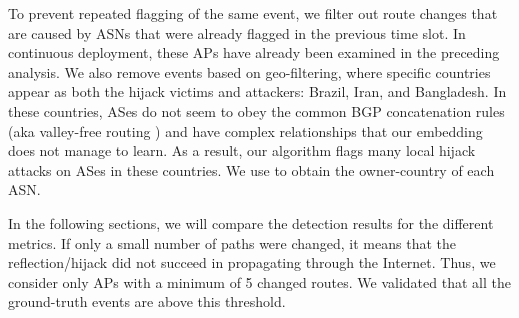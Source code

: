 \documentclass[10pt,journal]{IEEEtran}
\begin{document}
To prevent repeated flagging of the same event, we filter out route changes that are caused by ASNs that were already flagged in the previous time slot. In continuous deployment, these APs have already been examined in the preceding analysis. We also remove events based on geo-filtering, where specific countries appear as both the hijack victims and attackers: Brazil, Iran, and Bangladesh. In these countries, ASes do not seem to obey the common BGP concatenation rules (aka valley-free routing \cite{gao2001inferring}) and have complex relationships that our embedding does not manage to learn. As a result, our algorithm flags many local hijack attacks on ASes in these countries. We use \cite{caida} to obtain the owner-country of each ASN.

In the following sections, we will compare the detection results for the different metrics. If only a small number of paths were changed, it means that the reflection/hijack did not succeed in propagating through the Internet. Thus, we consider only APs with a minimum of 5 changed routes. We validated that all the ground-truth events are above this threshold.



\end{document}
